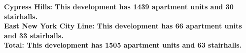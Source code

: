 \bf{Cypress Hills}: This development has 1439 apartment units and 30 stairhalls.\\\bf{East New York City Line}: This development has 66 apartment units and 33 stairhalls.\\\bf{Total}: This development has 1505 apartment units and 63 stairhalls.\\